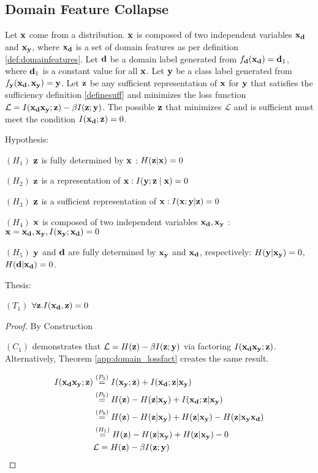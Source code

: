 \subsection{Domain Feature Collapse}

\begin{theorem}

Let ${\mathbf{x}}$ come from a distribution. ${\mathbf{x}}$ is composed of two independent variables ${\mathbf{x}}_{\mathbf{d}}$ and ${\mathbf{x}}_{\mathbf{y}}$, where ${\mathbf{x}}_{\mathbf{d}}$ is a set of domain features as per definition \ref{def:domainfeatures}. Let ${\mathbf{d}}$ be a domain label generated from $f_{\mathbf{d}}({\mathbf{x}}_{\mathbf{d}}) = {\mathbf{d}}_1$, where ${\mathbf{d}}_1$ is a constant value for all ${\mathbf{x}}$. Let ${\mathbf{y}}$ be a class label generated from $f_{\mathbf{y}}({\mathbf{x}}_{\mathbf{d}}, {\mathbf{x}}_{\mathbf{y}}) = {\mathbf{y}}$. Let ${\mathbf{z}}$ be any sufficient representation of ${\mathbf{x}}$ for ${\mathbf{y}}$ that satisfies the sufficiency definition \ref{definesuff} and minimizes the loss function $\mathcal{L} = I({\mathbf{x}}_{\mathbf{d}} {\mathbf{x}}_{\mathbf{y}}; {\mathbf{z}}) - \beta I({\mathbf{z}};{\mathbf{y}})$. The possible ${\mathbf{z}}$ that minimizes $\mathcal{L}$  and is sufficient must meet the condition $I({\mathbf{x}}_{\mathbf{d}}; {\mathbf{z}}) = 0$.

Hypothesis:

$(H_1)$  ${\mathbf{z}}$ is fully determined by ${\mathbf{x}}$ : $H({\mathbf{z}}|{\mathbf{x}}) = 0$

$(H_2)$  ${\mathbf{z}}$ is a representation of ${\mathbf{x}}: I({\mathbf{y}} ; {\mathbf{z}} \mid {\mathbf{x}})=0$

$(H_3)$  ${\mathbf{z}}$ is a sufficient representation of ${\mathbf{x}}: I({\mathbf{x}} ; {\mathbf{y}} | {\mathbf{z}})=0$

$(H_4)$ ${\mathbf{x}}$ is composed of two independent variables ${\mathbf{x}}_{\mathbf{d}}, {\mathbf{x}}_{\mathbf{y}}$ : ${\mathbf{x}} = {\mathbf{x}}_{\mathbf{d}}, {\mathbf{x}}_{\mathbf{y}}, I({\mathbf{x}}_{\mathbf{y}}; {\mathbf{x}}_{\mathbf{d}}) = 0$

$(H_5)$ ${\mathbf{y}}$  and ${\mathbf{d}}$ are fully determined by ${\mathbf{x}}_{\mathbf{y}}$ and ${\mathbf{x}}_{\mathbf{d}}$, respectively: $H({\mathbf{y}} | {\mathbf{x}}_{\mathbf{y}}) = 0$, $H({\mathbf{d}} | {\mathbf{x}}_{\mathbf{d}}) = 0$.

Thesis:

$(T_1)$ $\forall {\mathbf{z}}.I({\mathbf{x}}_{\mathbf{d}},{\mathbf{z}}) = 0$

\begin{proof} By Construction

$(C_1)$ demonstrates that $\mathcal{L}=H({\mathbf{z}}) -\beta I({\mathbf{z}};{\mathbf{y}})$ via factoring $I({\mathbf{x}}_{\mathbf{d}} {\mathbf{x}}_{\mathbf{y}};{\mathbf{z}})$. Alternatively, Theorem \ref{app:domain_lossfact} creates the same result.

$$
    \begin{aligned}
    I({\mathbf{x}}_{\mathbf{d}} {\mathbf{x}}_{\mathbf{y}}; {\mathbf{z}}) &\stackrel{\left(P_2\right)}{=} I({\mathbf{x}}_{\mathbf{y}}; {\mathbf{z}}) + I({\mathbf{x}}_{\mathbf{d}}; {\mathbf{z}}| {\mathbf{x}}_{\mathbf{y}})\\
    &\stackrel{\left(P_5\right)}{=} H({\mathbf{z}}) -  H({\mathbf{z}}| {\mathbf{x}}_{\mathbf{y}}) + I({\mathbf{x}}_{\mathbf{d}}; {\mathbf{z}}| {\mathbf{x}}_{\mathbf{y}}) \\
    &\stackrel{\left(P_9\right)}{=} H({\mathbf{z}}) -  H({\mathbf{z}}| {\mathbf{x}}_{\mathbf{y}}) + H({\mathbf{z}}| {\mathbf{x}}_{\mathbf{y}}) - H({\mathbf{z}}| {\mathbf{x}}_{\mathbf{y}} {\mathbf{x}}_{\mathbf{d}}) \\
    &\stackrel{\left(H_1\right)}{=}H({\mathbf{z}}) -  H({\mathbf{z}}| {\mathbf{x}}_{\mathbf{y}}) + H({\mathbf{z}}| {\mathbf{x}}_{\mathbf{y}}) - 0 \\
    &\mathcal{L}=H({\mathbf{z}})  -\beta I({\mathbf{z}}; {\mathbf{y}})
    \end{aligned}
$$


\end{proof}
\end{theorem}
